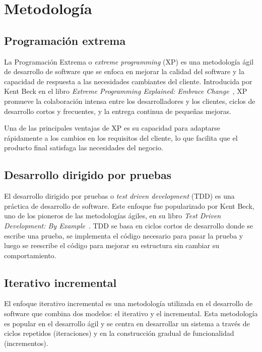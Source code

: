 \chapter{Metodología}\label{ch:chapter_3}


\section{Programación extrema}

La Programación Extrema o \textit{extreme programming} (XP) es una metodología ágil de desarrollo de software que se
enfoca en mejorar la calidad del software y la capacidad de respuesta a las necesidades cambiantes del cliente.
Introducida por Kent Beck en el libro \textit{Extreme Programming Explained: Embrace Change}~\cite{book_beck_1999},
XP promueve la colaboración intensa entre los desarrolladores y los clientes, ciclos de
desarrollo cortos y frecuentes, y la entrega continua de pequeñas mejoras.

Una de las principales ventajas de XP es su capacidad para adaptarse rápidamente a los cambios en los requisitos del
cliente, lo que facilita que el producto final satisfaga las necesidades del negocio.


\section{Desarrollo dirigido por pruebas}

El desarrollo dirigido por pruebas o \textit{test driven development} (TDD) es una práctica de desarrollo de software.
Este enfoque fue popularizado por Kent Beck, uno de los pioneros de las metodologías ágiles, en su libro
\textit{Test Driven Development: By Example}~\cite{book_beck_2003}.
TDD se basa en ciclos cortos de desarrollo donde se escribe una prueba, se implementa el código necesario para pasar la
prueba y luego se reescribe el código para mejorar su estructura sin cambiar su comportamiento.


\section{Iterativo incremental}\label{sec:iterativo_incremental}

El enfoque iterativo incremental es una metodología utilizada en el desarrollo de software que combina dos modelos:
el iterativo y el incremental.
Esta metodología es popular en el desarrollo ágil y se centra en desarrollar un sistema a través de ciclos repetidos
(iteraciones) y en la construcción gradual de funcionalidad (incrementos).

